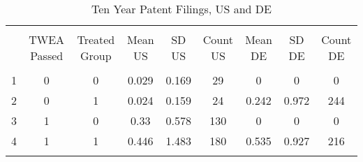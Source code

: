 
\begin{table}[!htbp] \centering 
  \caption{Ten Year Patent Filings, US and DE} 
  \label{q2_table} 
\begin{tabular}{@{\extracolsep{5pt}} ccccccccc} 
\\[-1.8ex]\hline 
\hline \\[-1.8ex] 
 & TWEA Passed & Treated Group & Mean US & SD US & Count US & Mean DE & SD DE & Count DE \\ 
\hline \\[-1.8ex] 
1 & 0 & 0 & 0.029 & 0.169 & 29 & 0 & 0 & 0 \\ 
2 & 0 & 1 & 0.024 & 0.159 & 24 & 0.242 & 0.972 & 244 \\ 
3 & 1 & 0 & 0.33 & 0.578 & 130 & 0 & 0 & 0 \\ 
4 & 1 & 1 & 0.446 & 1.483 & 180 & 0.535 & 0.927 & 216 \\ 
\hline \\[-1.8ex] 
\end{tabular} 
\end{table} 
